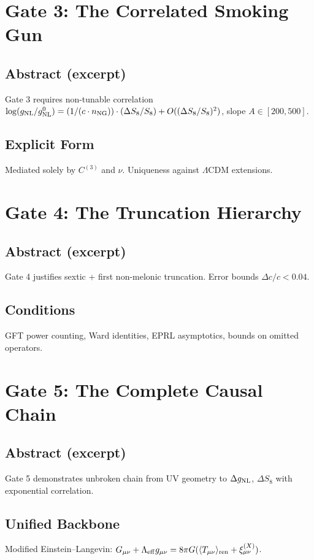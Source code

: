 \documentclass[11pt,a4paper,twoside]{article}
\begin{document}
\chapter{Gate 3: The Correlated Smoking Gun}

\section{Abstract (excerpt)}
Gate 3 requires non-tunable correlation $\log(g_{\rm NL}/g_{\rm NL}^0) = (1/(c \cdot n_{\rm NG})) \cdot (\Delta S_8/S_8) + O((\Delta S_8/S_8)^2)$, slope $A \in [200,500]$.

\section{Explicit Form}
Mediated solely by $C^{(3)}$ and $\nu$. Uniqueness against $\Lambda$CDM extensions.

\chapter{Gate 4: The Truncation Hierarchy}

\section{Abstract (excerpt)}
Gate 4 justifies sextic + first non-melonic truncation. Error bounds $\Delta c/c < 0.04$.

\section{Conditions}
GFT power counting, Ward identities, EPRL asymptotics, bounds on omitted operators.

\chapter{Gate 5: The Complete Causal Chain}

\section{Abstract (excerpt)}
Gate 5 demonstrates unbroken chain from UV geometry to $\Delta g_{\rm NL}$, $\Delta S_8$ with exponential correlation.

\section{Unified Backbone}
Modified Einstein–Langevin: $G_{\mu\nu} + \Lambda_{\rm eff} g_{\mu\nu} = 8\pi G (\langle T_{\mu\nu} \rangle_{\rm ren} + \xi_{\mu\nu}^{(X)})$.
\end{document}
